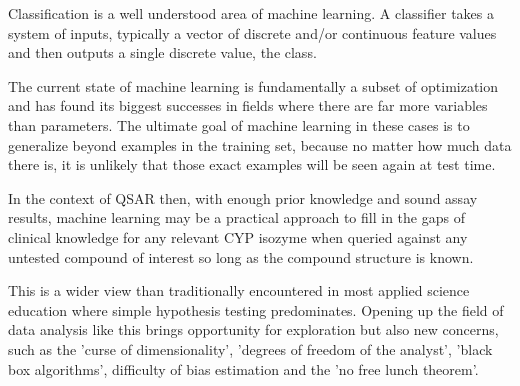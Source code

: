 Classification is a well understood area of machine learning. A classifier takes a system of inputs, typically a vector of discrete and/or continuous feature values and then outputs a single discrete value, the class. \cite{Domingos2012}

The current state of machine learning is fundamentally a subset of optimization and has found its biggest successes in fields where there are far more variables than parameters. The ultimate goal of machine learning in these cases is to generalize beyond examples in the training set, because no matter how much data there is, it is unlikely that those exact examples will be seen again at test time. \cite{Domingos2012} 


In the context of QSAR then, with enough prior knowledge and sound assay results, machine learning may be a practical approach to fill in the gaps of clinical knowledge for any relevant CYP isozyme when queried against any untested compound of interest so long as the compound structure is known.

This is a wider view than traditionally encountered in most applied science education where simple hypothesis testing predominates. Opening up the field of data analysis like this brings opportunity for exploration but also new concerns, such as the 'curse of dimensionality', 'degrees of freedom of the analyst', 'black box algorithms', difficulty of bias estimation and the 'no free lunch theorem'. \cite{Boulesteix2014}





